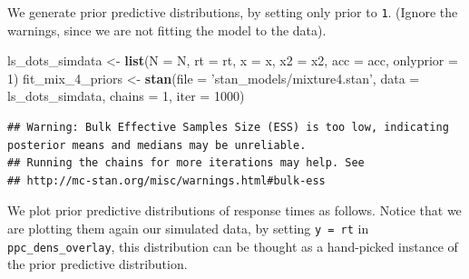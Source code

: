 \documentclass[12pt,]{krantz}
\newenvironment{Shaded}{\begin{snugshade}}{\end{snugshade}}
\newcommand{\KeywordTok}[1]{\textcolor[rgb]{0.13,0.29,0.53}{\textbf{#1}}}
\newcommand{\DataTypeTok}[1]{\textcolor[rgb]{0.13,0.29,0.53}{#1}}
\newcommand{\DecValTok}[1]{\textcolor[rgb]{0.00,0.00,0.81}{#1}}
\newcommand{\StringTok}[1]{\textcolor[rgb]{0.31,0.60,0.02}{#1}}
\newcommand{\OperatorTok}[1]{\textcolor[rgb]{0.81,0.36,0.00}{\textbf{#1}}}
\newcommand{\NormalTok}[1]{#1}
\theoremstyle{definition}
\theoremstyle{definition}
\theoremstyle{definition}
\theoremstyle{remark}
\begin{document}
We generate prior predictive distributions, by setting only prior to
\texttt{1}. (Ignore the warnings, since we are not fitting the model to
the data).

\begin{Shaded}
\begin{Highlighting}[]
\NormalTok{ls_dots_simdata <-}\StringTok{ }\KeywordTok{list}\NormalTok{(}\DataTypeTok{N =}\NormalTok{ N,}
                        \DataTypeTok{rt =}\NormalTok{ rt,}
                        \DataTypeTok{x =}\NormalTok{ x,}
                        \DataTypeTok{x2 =}\NormalTok{ x2,}
                        \DataTypeTok{acc =}\NormalTok{ acc,}
                        \DataTypeTok{onlyprior =} \DecValTok{1}\NormalTok{) }
\NormalTok{fit_mix_}\DecValTok{4}\NormalTok{_priors <-}\StringTok{ }\KeywordTok{stan}\NormalTok{(}\DataTypeTok{file =} \StringTok{'stan_models/mixture4.stan'}\NormalTok{,}
                         \DataTypeTok{data =}\NormalTok{ ls_dots_simdata,}
                         \DataTypeTok{chains =} \DecValTok{1}\NormalTok{, }\DataTypeTok{iter =} \DecValTok{1000}\NormalTok{)  }
\end{Highlighting}
\end{Shaded}

\begin{verbatim}
## Warning: Bulk Effective Samples Size (ESS) is too low, indicating posterior means and medians may be unreliable.
## Running the chains for more iterations may help. See
## http://mc-stan.org/misc/warnings.html#bulk-ess
\end{verbatim}

We plot prior predictive distributions of response times as follows.
Notice that we are plotting them again our simulated data, by setting
\texttt{y\ =\ rt} in \texttt{ppc\_dens\_overlay}, this distribution can
be thought as a hand-picked instance of the prior predictive
distribution.

\begin{Shaded}
\end{Shaded}
\end{document}
